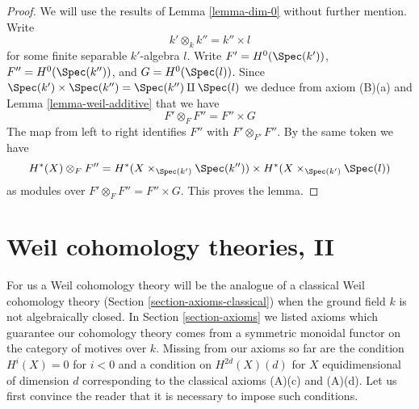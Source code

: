 \begin{proof}
We will use the results of Lemma \ref{lemma-dim-0} without further mention.
Write
$$
k' \otimes_k k'' = k'' \times l
$$
for some finite separable $k'$-algebra $l$. Write
$F' = H^0(\Spec(k'))$, $F'' = H^0(\Spec(k''))$, and $G = H^0(\Spec(l))$.
Since $\Spec(k') \times \Spec(k'') = \Spec(k'') \amalg \Spec(l)$ we
deduce from axiom (B)(a) and Lemma \ref{lemma-weil-additive}
that we have
$$
F' \otimes_F F'' = F'' \times G
$$
The map from left to right identifies $F''$ with $F' \otimes_{F'} F''$.
By the same token we have
$$
H^*(X) \otimes_F F'' = H^*(X \times_{\Spec(k')} \Spec(k''))
\times H^*(X \times_{\Spec(k')} \Spec(l))
$$
as modules over $F' \otimes_F F'' = F'' \times G$. This proves the lemma.
\end{proof}






















\section{Weil cohomology theories, II}
\label{section-old}

\noindent
For us a Weil cohomology theory will be the analogue of a
classical Weil cohomology theory (Section \ref{section-axioms-classical})
when the ground field $k$ is not algebraically closed.
In Section \ref{section-axioms} we listed axioms which guarantee
our cohomology theory comes from a symmetric monoidal functor
on the category of motives over $k$. Missing from our axioms so
far are the condition $H^i(X) = 0$ for $i < 0$ and
a condition on $H^{2d}(X)(d)$ for $X$ equidimensional of dimension $d$
corresponding to the classical axioms (A)(c) and (A)(d).
Let us first convince the reader that it is necessary to impose
such conditions.


